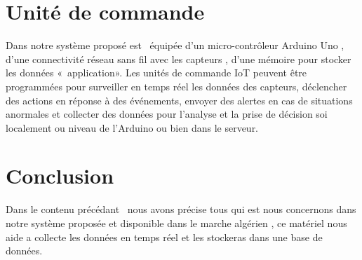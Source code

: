  \section{Unité de commande}
 Dans notre système proposé est  équipée d'un micro-contrôleur Arduino Uno , d'une connectivité réseau sans fil avec les capteurs , d'une mémoire pour stocker les données « application».
Les unités de commande IoT peuvent être programmées pour surveiller en temps réel les données des capteurs, déclencher des actions en réponse à des événements, envoyer des alertes en cas de situations anormales et collecter des données pour l'analyse et la prise de décision soi localement ou niveau de l’Arduino ou bien dans le serveur.
\section{Conclusion}
Dans le contenu précédant  nous avons précise tous qui est nous concernons dans notre système proposée et disponible dans le marche algérien , ce matériel nous aide a collecte les données en temps réel et les stockeras dans une base de données.   

 

